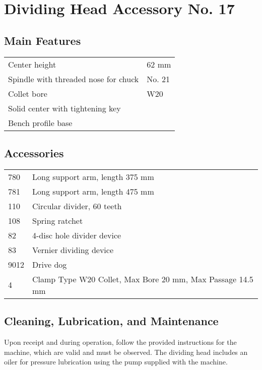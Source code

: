 \chapter{Dividing Head \small{Accessory No. 17}}

\section*{Main Features}

\begin{tabular}{@{}ll@{}}
    Center height                        & 62 mm  \\
    Spindle with threaded nose for chuck & No. 21 \\
    Collet bore                          & W20    \\
    Solid center with tightening key     &        \\
    Bench profile base                   &
\end{tabular}

\section*{Accessories}
\begin{tabular}{@{}ll@{}}
    780  & Long support arm, length 375 mm                            \\
    781  & Long support arm, length 475 mm                            \\
    110  & Circular divider, 60 teeth                                 \\
    108  & Spring ratchet                                             \\
    82   & 4-disc hole divider device                                 \\
    83   & Vernier dividing device                                    \\
    9012 & Drive dog                                                  \\
    4    & Clamp Type W20 Collet, Max Bore 20 mm, Max Passage 14.5 mm \\
\end{tabular}

\section*{Cleaning, Lubrication, and Maintenance}
Upon receipt and during operation, follow the provided instructions for the machine, which are valid and must be observed.
The dividing head includes an oiler for pressure lubrication using the pump supplied with the machine.


